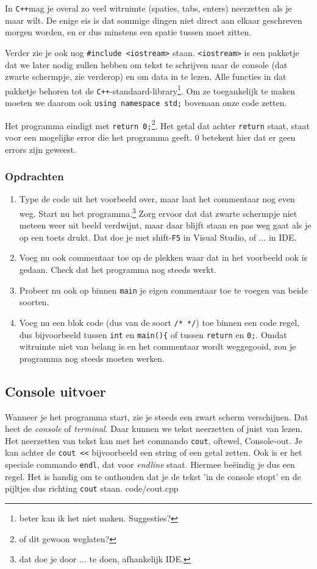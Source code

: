 \documentclass[12pt,a4paper]{article}
\newcommand{\code}{}
\newcommand{\icode}{\lstinline}
\newcommand{\mono}{\texttt}
\newcommand{\cpp}{\mono{C++}}
\begin{document}
In \cpp  mag je overal zo veel witruimte (spaties, tabs, enters) neerzetten als je maar wilt. De enige eis is dat sommige dingen niet direct aan elkaar geschreven morgen worden, en er dus minstens een spatie tussen moet zitten.


Verder zie je ook nog \icode{#include <iostream>} staan. \icode{<iostream>} is een pakketje dat we later nodig zullen hebben om tekst te schrijven naar de console (dat zwarte schermpje, zie verderop) en om data in te lezen. Alle functies in dat pakketje behoren tot de \cpp-standaard-library\footnote{beter kan ik het niet maken. Suggesties?}. Om ze toegankelijk te maken moeten we daarom ook \icode{using namespace std;} bovenaan onze code zetten.


Het programma eindigt met \icode{return 0;}\footnote{of dit gewoon weglaten?}. Het getal dat achter \icode{return} staat, staat voor een mogelijke error die het programma geeft. 0 betekent hier dat er geen errors zijn geweest.
\subsubsection{Opdrachten}
\begin{enumerate}
	\item
		Type de code uit het voorbeeld over, maar laat het commentaar nog even weg. Start nu het programma.\footnote{dat doe je door ... te doen, afhankelijk IDE.} Zorg ervoor dat dat zwarte schermpje niet meteen weer uit beeld verdwijnt, maar daar blijft staan en pas weg gaat als je op een toets drukt.
		Dat doe je met shift-\mono{F5} in Visual Studio, of ... in IDE.
	\item
		Voeg nu ook commentaar toe op de plekken waar dat in het voorbeeld ook is gedaan. Check dat het programma nog steeds werkt.
	\item
		Probeer nu ook op binnen \icode{main} je eigen commentaar toe te voegen van beide soorten.
	\item 
		Voeg nu een blok code (dus van de soort \icode{/* */}) toe binnen een code regel, dus bijvoorbeeld tussen \icode{int} en \icode{main(){} of tussen \icode{return} en \icode{0;}. Omdat witruimte niet van belang is en het commentaar wordt weggegooid, zou je programma nog steeds moeten werken.
\end{enumerate}

\subsection{Console uitvoer}
Wanneer je het programma start, zie je steeds een zwart scherm verschijnen. Dat heet de \emph{console} of \emph{terminal}. Daar kunnen we tekst neerzetten of juist van lezen. Het neerzetten van tekst kan met het commando \icode{cout}, oftewel, Console-out. Je kan achter de \icode{cout <<} bijvoorbeeld een string of een getal zetten. Ook is er het speciale commando \icode{endl}, dat voor \emph{endline} staat. Hiermee be\"eindig je dus een regel. Het is handig om te onthouden dat je de tekst 'in de console stopt' en de pijltjes dus richting \icode{cout} staan.
\code{code/cout.cpp}
\end{document}
